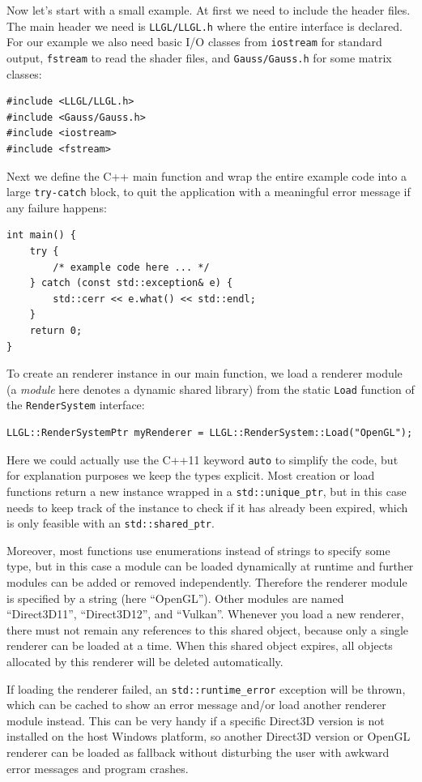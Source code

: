 \documentclass{article}
\begin{document}
Now let's start with a small example. At first we need to include the header files.
The main header we need is \texttt{LLGL/LLGL.h} where the entire \LLGL interface is declared.
For our example we also need basic I/O classes from \texttt{iostream} for standard output, \texttt{fstream}
to read the shader files, and \texttt{Gauss/Gauss.h} for some matrix classes:
\begin{lstlisting}
#include <LLGL/LLGL.h>
#include <Gauss/Gauss.h>
#include <iostream>
#include <fstream>
\end{lstlisting}
Next we define the C++ main function and wrap the entire example code into a large \texttt{try-catch} block,
to quit the application with a meaningful error message if any failure happens:
\begin{lstlisting}
int main() {
    try {
        /* example code here ... */
    } catch (const std::exception& e) {
        std::cerr << e.what() << std::endl;
    }
    return 0;
}
\end{lstlisting}
To create an \LLGL renderer instance in our main function, we load a renderer module
(a \textit{module} here denotes a dynamic shared library)
from the static \texttt{Load} function of the \texttt{RenderSystem} interface:
\begin{lstlisting}
LLGL::RenderSystemPtr myRenderer = LLGL::RenderSystem::Load("OpenGL");
\end{lstlisting}
Here we could actually use the C++11 keyword \texttt{auto} to simplify the code,
but for explanation purposes we keep the types explicit.
Most creation or load functions return a new instance wrapped in a \texttt{std::unique\_ptr},
but in this case \LLGL needs to keep track of the instance to check if it has already been expired,
which is only feasible with an \texttt{std::shared\_ptr}.

Moreover, most functions use enumerations instead of strings to specify some type, but in this case
a module can be loaded dynamically at runtime and further modules can be added or removed independently.
Therefore the renderer module is specified by a string (here ``OpenGL''). Other modules are
named ``Direct3D11'', ``Direct3D12'', and ``Vulkan''.
Whenever you load a new renderer, there must not remain any references to this shared object,
because only a single renderer can be loaded at a time.
When this shared object expires, all objects allocated by this renderer will be deleted automatically.

If loading the renderer failed, an \texttt{std::runtime\_error} exception will be thrown,
which can be cached to show an error message and/or load another renderer module instead.
This can be very handy if a specific Direct3D version is not installed on the host Windows platform,
so another Direct3D version or OpenGL renderer can be loaded as fallback
without disturbing the user with awkward error messages and program crashes.
\end{document}

